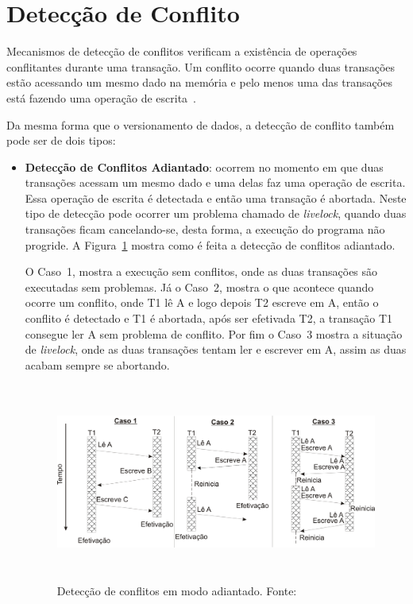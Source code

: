 \documentclass[diss,capa]{texufpel}
\begin{document}
\section{Detecção de Conflito}

Mecanismos de detecção de conflitos verificam a existência de operações conflitantes durante uma transação. Um conflito ocorre quando duas transações estão acessando um mesmo dado na memória e pelo menos uma das transações está fazendo uma operação de escrita~\cite{BaldassinTese2009}.

Da mesma forma que o versionamento de dados, a detecção de conflito também pode ser de dois tipos:

\begin{itemize}
 \item \textbf{Detecção de Conflitos Adiantado}: ocorrem no momento em que duas transações acessam um mesmo dado e uma delas faz uma operação de escrita. Essa operação de escrita é detectada e então uma transação é abortada. Neste tipo de detecção pode ocorrer um problema chamado de \emph{livelock}, quando duas transações ficam cancelando-se, desta forma, a execução do programa não progride. A Figura~\ref{figuradeteccaoadiantado} mostra como é feita a detecção de conflitos adiantado.

 O Caso~1, mostra a execução sem conflitos, onde as duas transações são executadas sem problemas. Já o Caso~2, mostra o que acontece quando ocorre um conflito, onde T1 lê A e logo depois T2 escreve em A, então o conflito é detectado e T1 é abortada, após ser efetivada T2, a transação T1 consegue ler A sem problema de conflito. Por fim o Caso~3 mostra a situação de \emph{livelock}, onde as duas transações tentam ler e escrever em A, assim as duas acabam sempre se abortando.


\begin{figure}[!htp]
\centering
\includegraphics[height=6.5cm]{images/conflitoadiantado.png}
\caption{Detecção de conflitos em modo adiantado. Fonte:~\cite{rigotm}}
\label{figuradeteccaoadiantado}
\end{figure}



\end{itemize}
\end{document}

